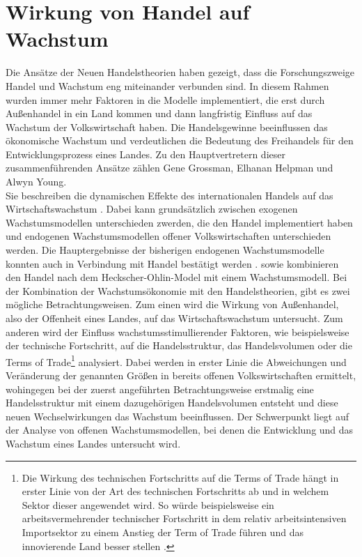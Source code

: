 \section{Wirkung von Handel auf Wachstum}\label{WirkungHandel}
Die Ansätze der Neuen Handelstheorien haben gezeigt, dass die Forschungszweige Handel und Wachstum eng miteinander verbunden sind. In diesem Rahmen wurden immer mehr Faktoren in die Modelle implementiert, die erst durch Außenhandel in ein Land kommen und dann langfristig Einfluss auf das Wachstum der Volkswirtschaft haben. Die Handelsgewinne beeinflussen das ökonomische Wachstum und verdeutlichen die Bedeutung des Freihandels für den Entwicklungsprozess eines Landes. Zu den Hauptvertretern dieser zusammenführenden Ansätze zählen Gene Grossman, Elhanan Helpman und Alwyn Young.\\
%
Sie beschreiben die dynamischen Effekte des internationalen Handels auf das Wirtschaftswachstum \cite{Young.1991,Grossman.1995}. Dabei kann grundsätzlich zwischen exogenen Wachstumsmodellen unterschieden zwerden, die den Handel implementiert haben \cite{Dixit.1980,Ethier.1982,Krugman.1979ab,Krugman.1981,Lancaster.1980} und endogenen Wachstumsmodellen offener Volkswirtschaften \cite{Dinopoulos.,Feenstra.,Grossman.1989a,Grossman1989b.,Grossman.1990d,Grossman.1991c,Krugman.1990,Segerstrom.1990,Young.1991,Backus} unterschieden werden. Die Hauptergebnisse der bisherigen endogenen Wachstumsmodelle konnten auch in Verbindung mit Handel bestätigt werden \cite{vanLong.1997}. 
%
\cite{Atkeson.2000} sowie \cite{Cunat.2001} kombinieren den Handel nach dem Heckscher-Ohlin-Model mit einem Wachstumsmodell. 
%
Bei der Kombination der Wachstumsökonomie mit den Handelstheorien, gibt es zwei mögliche Betrachtungsweisen. Zum einen wird die Wirkung von Außenhandel, also der Offenheit eines Landes, auf das Wirtschaftswachstum untersucht. Zum anderen wird der Einfluss wachstumsstimullierender Faktoren, wie beispielsweise der technische Fortschritt, auf die Handelsstruktur, das Handelsvolumen oder die Terms of Trade\footnote{Die Wirkung des technischen Fortschritts auf die Terms of Trade hängt in erster Linie von der Art des technischen Fortschritts ab und in welchem Sektor dieser angewendet wird. So würde beispielsweise ein arbeitsvermehrender technischer Fortschritt in dem relativ arbeitsintensiven Importsektor zu einem Anstieg der Term of Trade führen und das innovierende Land besser stellen \cite{Gandolfo.1998}.} analysiert. Dabei werden in erster Linie die Abweichungen und Veränderung der genannten Größen in bereits offenen Volkswirtschaften ermittelt, wohingegen bei der zuerst angeführten Betrachtungsweise erstmalig eine Handelsstruktur mit einem dazugehörigen Handelsvolumen entsteht und diese neuen Wechselwirkungen das Wachstum beeinflussen. Der Schwerpunkt liegt auf der Analyse von offenen Wachstumsmodellen, bei denen die Entwicklung und das Wachstum eines Landes untersucht wird.
%
